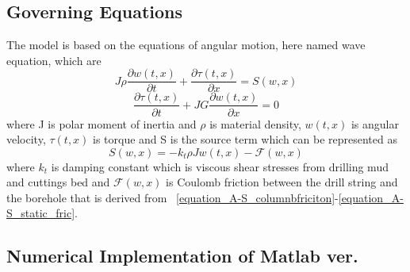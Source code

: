 \subsection{Governing Equations}
The model is based on the equations of angular motion, here named wave equation, which are
\begin{equation}\label{AS-motion}
  J\rho\frac{\partial w(t,x)}{\partial t} + \frac{\partial \tau (t,x)}{\partial x} = S(w,x) 
\end{equation}
\begin{equation}\label{AS-motion1}
 \frac{\partial\tau(t,x)}{\partial t} + JG\frac{\partial w(t,x)}{\partial x} = 0 
\end{equation}
where J is polar moment of inertia and $\rho$ is material density, $w(t,x)$ is angular velocity, $\tau(t,x)$ is torque and S is the source term which can be represented as
\begin{equation}\label{AS-sourceterm}
  S(w,x) = -k_t \rho J w(t,x) - \mathcal{F}(w,x)
\end{equation}
where $k_t$ is damping constant which is viscous shear stresses from drilling mud and cuttings bed and $\mathcal{F}(w,x)$ is Coulomb friction between the drill string and the borehole that is derived from \equationname~\ref{equation_A-S_columnbfriciton}-\ref{equation_A-S_static_fric}.

\subsection{Numerical Implementation of Matlab ver.}
